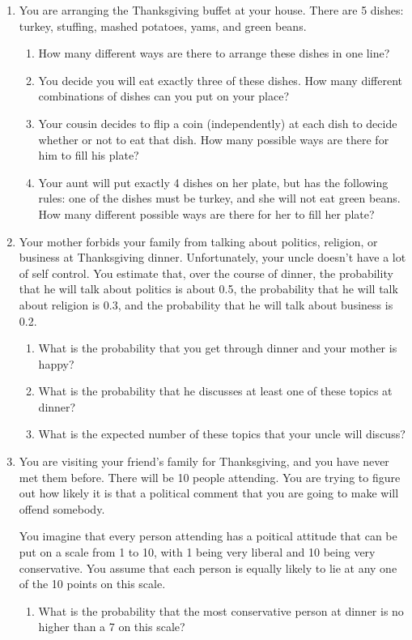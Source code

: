 \documentclass[11pt]{article}
\begin{document}
\begin{enumerate}
\item You are arranging the Thanksgiving buffet at your house. There are 5 dishes: turkey, stuffing, mashed potatoes, yams, and green beans.
\begin{enumerate}
    \item How many different ways are there to arrange these dishes in one line? 
    \item You decide you will eat exactly three of these dishes. How many different combinations of dishes can you put on your place?
    \item Your cousin decides to flip a coin (independently) at each dish to decide whether or not to eat that dish. How many possible ways are there for him to fill his plate?
    \item Your aunt will put exactly 4 dishes on her plate, but has the following rules: one of the dishes must be turkey, and she will not eat green beans. How many different possible ways are there for her to fill her plate?
\end{enumerate}

\item Your mother forbids your family from talking about politics, religion, or business at Thanksgiving dinner. Unfortunately, your uncle doesn't have a lot of self control. You estimate that, over the course of dinner, the probability that he will talk about politics is about 0.5, the probability that he will talk about religion is 0.3, and the probability that he will talk about business is 0.2.
\begin{enumerate}
\item What is the probability that you get through dinner and your mother is happy?
\item What is the probability that he discusses at least one of these topics at dinner?
\item What is the expected number of these topics that your uncle will discuss?
\end{enumerate}

\item You are visiting your friend's family for Thanksgiving, and you have never met them before. There will be 10 people attending. You are trying to figure out how likely it is that a political comment that you are going to make will offend somebody.

You imagine that every person attending has a poitical attitude that can be put on a scale from 1 to 10, with 1 being very liberal and 10 being very conservative. You assume that each person is equally likely to lie at any one of the 10 points on this scale.
\begin{enumerate}
\item What is the probability that the most conservative person at dinner is no higher than a 7 on this scale?


\end{enumerate}
\end{enumerate}
\end{document}
